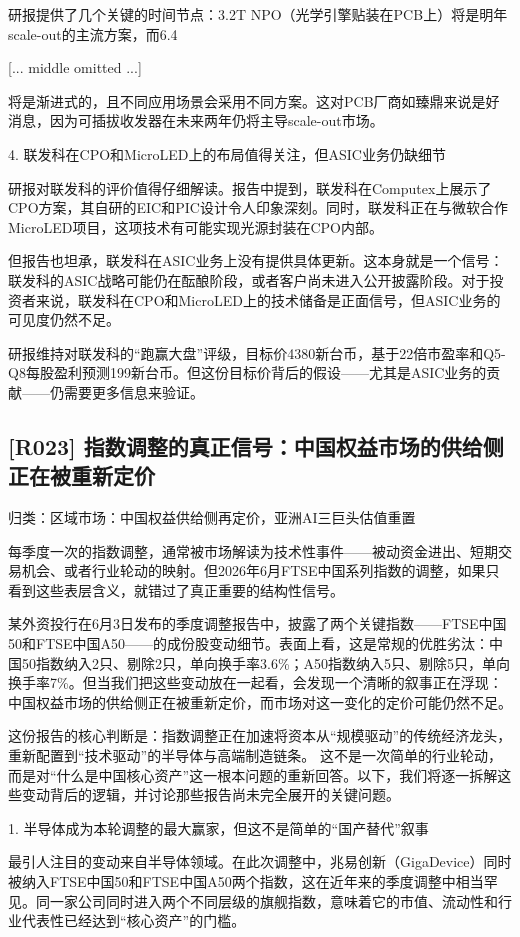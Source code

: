 \documentclass[11pt]{ctexart}
\begin{document}
研报提供了几个关键的时间节点：3.2T NPO（光学引擎贴装在PCB上）将是明年scale-out的主流方案，而6.4

[... middle omitted ...]

将是渐进式的，且不同应用场景会采用不同方案。这对PCB厂商如臻鼎来说是好消息，因为可插拔收发器在未来两年仍将主导scale-out市场。

4. 联发科在CPO和MicroLED上的布局值得关注，但ASIC业务仍缺细节

研报对联发科的评价值得仔细解读。报告中提到，联发科在Computex上展示了CPO方案，其自研的EIC和PIC设计令人印象深刻。同时，联发科正在与微软合作MicroLED项目，这项技术有可能实现光源封装在CPO内部。

但报告也坦承，联发科在ASIC业务上没有提供具体更新。这本身就是一个信号：联发科的ASIC战略可能仍在酝酿阶段，或者客户尚未进入公开披露阶段。对于投资者来说，联发科在CPO和MicroLED上的技术储备是正面信号，但ASIC业务的可见度仍然不足。

研报维持对联发科的“跑赢大盘”评级，目标价4380新台币，基于22倍市盈率和Q5-Q8每股盈利预测199新台币。但这份目标价背后的假设——尤其是ASIC业务的贡献——仍需要更多信息来验证。

\subsection{[R023] 指数调整的真正信号：中国权益市场的供给侧正在被重新定价}
{\small\color{refgray}归类：区域市场：中国权益供给侧再定价，亚洲AI三巨头估值重置}

每季度一次的指数调整，通常被市场解读为技术性事件——被动资金进出、短期交易机会、或者行业轮动的映射。但2026年6月FTSE中国系列指数的调整，如果只看到这些表层含义，就错过了真正重要的结构性信号。

某外资投行在6月3日发布的季度调整报告中，披露了两个关键指数——FTSE中国50和FTSE中国A50——的成份股变动细节。表面上看，这是常规的优胜劣汰：中国50指数纳入2只、剔除2只，单向换手率3.6\%；A50指数纳入5只、剔除5只，单向换手率7\%。但当我们把这些变动放在一起看，会发现一个清晰的叙事正在浮现：中国权益市场的供给侧正在被重新定价，而市场对这一变化的定价可能仍然不足。

这份报告的核心判断是：指数调整正在加速将资本从“规模驱动”的传统经济龙头，重新配置到“技术驱动”的半导体与高端制造链条。 这不是一次简单的行业轮动，而是对“什么是中国核心资产”这一根本问题的重新回答。以下，我们将逐一拆解这些变动背后的逻辑，并讨论那些报告尚未完全展开的关键问题。

1. 半导体成为本轮调整的最大赢家，但这不是简单的“国产替代”叙事

最引人注目的变动来自半导体领域。在此次调整中，兆易创新（GigaDevice）同时被纳入FTSE中国50和FTSE中国A50两个指数，这在近年来的季度调整中相当罕见。同一家公司同时进入两个不同层级的旗舰指数，意味着它的市值、流动性和行业代表性已经达到“核心资产”的门槛。
\end{document}
